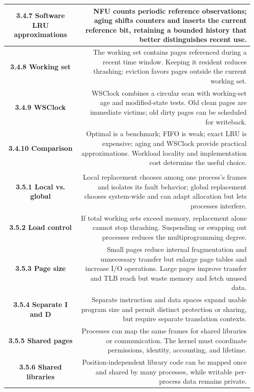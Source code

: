 \documentclass[10pt,letterpaper]{article}
\begin{document}
\begin{longtable}{C N}
\textbf{3.4.7 Software LRU approximations} & NFU counts periodic reference observations; aging shifts counters and inserts the current reference bit, retaining a bounded history that better distinguishes recent use.\\\hline
\textbf{3.4.8 Working set} & The working set contains pages referenced during a recent time window. Keeping it resident reduces thrashing; eviction favors pages outside the current working set.\\\hline
\textbf{3.4.9 WSClock} & WSClock combines a circular scan with working-set age and modified-state tests. Old clean pages are immediate victims; old dirty pages can be scheduled for writeback.\\\hline
\textbf{3.4.10 Comparison} & Optimal is a benchmark; FIFO is weak; exact LRU is expensive; aging and WSClock provide practical approximations. Workload locality and implementation cost determine the useful choice.\\\hline
{}\\*\hline
\textbf{3.5.1 Local vs. global} & Local replacement chooses among one process's frames and isolates its fault behavior; global replacement chooses system-wide and can adapt allocation but lets processes interfere.\\\hline
\textbf{3.5.2 Load control} & If total working sets exceed memory, replacement alone cannot stop thrashing. Suspending or swapping out processes reduces the multiprogramming degree.\\\hline
\textbf{3.5.3 Page size} & Small pages reduce internal fragmentation and unnecessary transfer but enlarge page tables and increase I/O operations. Large pages improve transfer and TLB reach but waste memory and fetch unused data.\\\hline
\textbf{3.5.4 Separate I and D} & Separate instruction and data spaces expand usable program size and permit distinct protection or sharing, but require separate translation contexts.\\\hline
\textbf{3.5.5 Shared pages} & Processes can map the same frames for shared libraries or communication. The kernel must coordinate permissions, identity, accounting, and lifetime.\\\hline
\textbf{3.5.6 Shared libraries} & Position-independent library code can be mapped once and shared by many processes, while writable per-process data remains private.\\\hline

\end{longtable}
\end{document}
